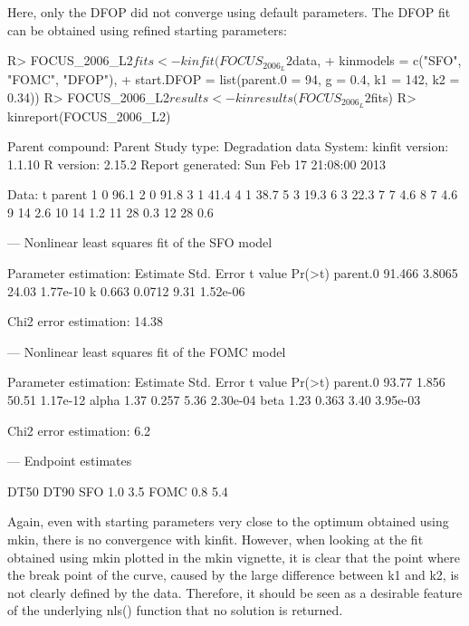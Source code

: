 \documentclass[12pt,a4paper]{article}
\begin{document}
Here, only the DFOP did not converge using default parameters. The DFOP fit can be 
obtained using refined starting parameters:

\begin{Schunk}
\begin{Sinput}
R> FOCUS_2006_L2$fits <- kinfit(FOCUS_2006_L2$data, 
+   kinmodels = c("SFO", "FOMC", "DFOP"),
+   start.DFOP = list(parent.0 = 94, g = 0.4, k1 = 142, k2 = 0.34))
R> FOCUS_2006_L2$results <- kinresults(FOCUS_2006_L2$fits)
R> kinreport(FOCUS_2006_L2)
\end{Sinput}
\begin{Soutput}
Parent compound:  Parent 
Study type:       Degradation data 
System:            
kinfit version:   1.1.10 
R version:        2.15.2 
Report generated: Sun Feb 17 21:08:00 2013 

Data:
    t parent
1   0   96.1
2   0   91.8
3   1   41.4
4   1   38.7
5   3   19.3
6   3   22.3
7   7    4.6
8   7    4.6
9  14    2.6
10 14    1.2
11 28    0.3
12 28    0.6



---
Nonlinear least squares fit of the SFO model

Parameter estimation:	
         Estimate Std. Error t value   Pr(>t)
parent.0   91.466     3.8065   24.03 1.77e-10
k           0.663     0.0712    9.31 1.52e-06

Chi2 error estimation: 14.38 %



---
Nonlinear least squares fit of the FOMC model

Parameter estimation:	
         Estimate Std. Error t value   Pr(>t)
parent.0    93.77      1.856   50.51 1.17e-12
alpha        1.37      0.257    5.36 2.30e-04
beta         1.23      0.363    3.40 3.95e-03

Chi2 error estimation: 6.2 %



---
Endpoint estimates

     DT50 DT90
SFO   1.0  3.5
FOMC  0.8  5.4
\end{Soutput}
\end{Schunk}

Again, even with starting parameters very close to the optimum obtained using mkin, 
there is no convergence with kinfit. However, when looking at the fit obtained using
mkin plotted in the mkin vignette, it is clear that the point where the break point 
of the curve, caused by the large difference between k1 and k2, is not clearly defined
by the data. Therefore, it should be seen as a desirable feature of the
underlying nls() function that no solution is returned.
\end{document}
